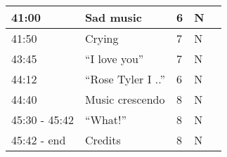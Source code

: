 \begin{longtable}{| p{70pt} | p{130pt} | p{45pt} | p{57pt} | p{60pt}|}
41:00           &          Sad music           &          6           &          N&\\\hline       
41:50           &          Crying           &          7           &          N&\\\hline       
43:45           &          ``I love you''           &          7           &          N&\\\hline       
44:12           &          ``Rose Tyler I ..''           &          6           &          N&\\\hline       
44:40           &          Music crescendo           &          8           &          N&\\\hline       
45:30 - 45:42           &          ``What!''           &          8           &          N&\\\hline       
45:42 - end           &          Credits           &          8           &          N&\\\hline       
\end{longtable}